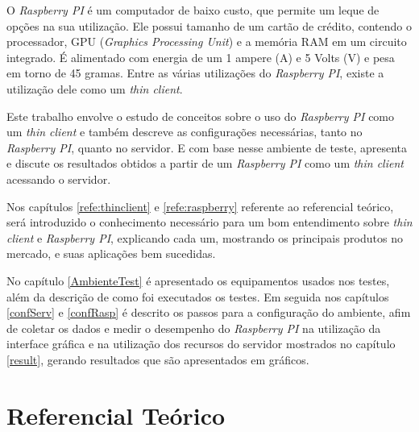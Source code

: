 \documentclass[
	12pt,				%
	openright,			%
	twoside,			%
	a4paper,			%
	chapter=TITLE,		%
	english,			%
	brazil				%
	]{abntex2}
\begin{document}
O \textit{Raspberry PI} é um computador de baixo custo, que permite um leque de opções na sua utilização. Ele possui tamanho de um cartão de crédito, contendo o processador, GPU (\textit{Graphics Processing Unit}) e a memória RAM em um circuito integrado. É alimentado com energia de um 1 ampere (A) e 5 Volts (V) e pesa em torno de 45 gramas. Entre as várias utilizações do \textit{Raspberry PI}, existe a utilização dele como um  \textit{thin client}.

Este trabalho envolve o estudo de conceitos sobre o uso do \textit{Raspberry PI} como um \textit{thin client} e também descreve as configurações necessárias, tanto no \textit{Raspberry PI}, quanto no servidor. E com base nesse ambiente de teste, apresenta e discute os resultados obtidos a partir de um \textit{Raspberry PI} como um \textit{thin client} acessando o servidor.

Nos capítulos \ref{refe:thinclient} e \ref{refe:raspberry} referente ao referencial teórico, será introduzido o conhecimento necessário para um bom entendimento sobre  \textit{thin client} e \textit{Raspberry PI}, explicando cada um, mostrando os principais produtos no mercado, e suas aplicações bem sucedidas. 

No capítulo \ref{AmbienteTest} é apresentado os equipamentos usados nos testes, além da descrição de como foi executados os testes. Em seguida nos capítulos \ref{confServ} e \ref{confRasp} é descrito os passos para a configuração do ambiente, afim de coletar os dados e medir o desempenho do \textit{Raspberry PI} na utilização da interface gráfica e na utilização dos recursos do servidor mostrados no capítulo \ref{result}, gerando resultados que são apresentados em gráficos.






\part{Referencial Teórico}
\end{document}

